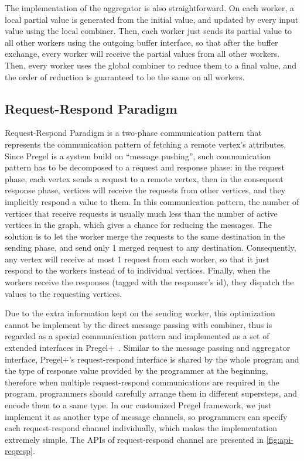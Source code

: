 \documentclass{sokendai_thesis} %
\begin{document}
The implementation of the aggregator is also straightforward.
On each worker, a local partial value is generated from the initial value, and updated by every input value using the local combiner.
Then, each worker just sends its partial value to all other workers using the outgoing buffer interface, so that after the buffer exchange, every worker will receive the partial values from all other workers.
Then, every worker uses the global combiner to reduce them to a final value, and the order of reduction is guaranteed to be the same on all workers.

\subsection{Request-Respond Paradigm}

Request-Respond Paradigm \cite{effective} is a two-phase communication pattern that represents the communication pattern of fetching a remote vertex's attributes.
Since Pregel is a system build on ``message pushing'', such communication pattern has to be decomposed to a request and response phase:
in the request phase, each vertex sends a request to a remote vertex, then in the consequent response phase, vertices will receive the requests from other vertices, and they implicitly respond a value to them.
In this communication pattern, the number of vertices that receive requests is usually much less than the number of active vertices in the graph, which gives a chance for reducing the messages.
The solution is to let the worker merge the requests to the same destination in the sending phase, and send only 1 merged request to any destination.
Consequently, any vertex will receive at most 1 request from each worker, so that it just respond to the workers instead of to individual vertices.
Finally, when the workers receive the responses (tagged with the responser's id), they dispatch the values to the requesting vertices.

Due to the extra information kept on the sending worker, this optimization cannot be implement by the direct message passing with combiner, thus is regarded as a special communication pattern and implemented as a set of extended interfaces in Pregel+~\cite{pregelplus}.
Similar to the message passing and aggregator interface, Pregel+'s request-respond interface is shared by the whole program and the type of response value provided by the programmer at the beginning, therefore when multiple request-respond communications are required in the program, programmers should carefully arrange them in different supersteps, and encode them to a same type.
In our customized Pregel framework, we just implement it as another type of message channels, so programmers can specify each request-respond channel individually, which makes the implementation extremely simple.
The APIs of request-respond channel are presented in \autoref{fig:api-reqresp}.
\end{document}

